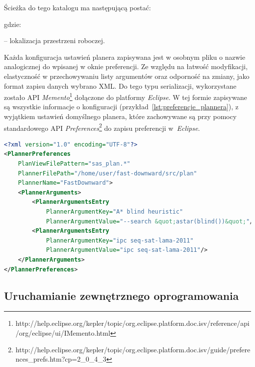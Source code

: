 Ścieżka do tego katalogu ma następującą postać:

\noindent
\centerline{}

\noindent
gdzie:

\noindent
\textbf{} -- lokalizacja przestrzeni roboczej.

Każda konfiguracja ustawień planera zapisywana jest w osobnym pliku o nazwie analogicznej do wpisanej w oknie preferencji. Ze względu na łatwość modyfikacji, elastyczność w przechowywaniu listy argumentów oraz odporność na zmiany, jako format zapisu danych wybrano XML. Do tego typu serializacji, wykorzystane zostało API \emph{Memento}\footnote{http://help.eclipse.org/kepler/topic/org.eclipse.platform.doc.isv/reference/api/org/eclipse/ui/IMemento.html}\cite{eclipseplugins} dołączone do platformy \emph{Eclipse}. W tej formie zapisywane są wszystkie informacje o konfiguracji (przykład~\ref{lst:preferencje_plannera}), z wyjątkiem ustawień domyślnego planera, które zachowywane są przy pomocy standardowego API \emph{Preferences}\footnote{http://help.eclipse.org/kepler/topic/org.eclipse.platform.doc.isv/guide/preferences\_prefs.htm?cp=2\_0\_4\_3}\cite{eclipseplugins} do zapisu preferencji w~\emph{Eclipse}.

\begin{Code}
\begin{lstlisting}[language=XML,frame=single,label={lst:preferencje_plannera},caption={Przykładowa konfiguracja planera FastDownward w postaci XML}]  % Start your code-block
<?xml version="1.0" encoding="UTF-8"?>
<PlannerPreferences 
	PlanViewFilePattern="sas_plan.*" 
	PlannerFilePath="/home/user/fast-downward/src/plan" 
	PlannerName="FastDownward">
	<PlannerArguments>
		<PlannerArgumentsEntry 
			PlannerArgumentKey="A* blind heuristic" 
			PlannerArgumentValue="--search &quot;astar(blind())&quot;"/>
		<PlannerArgumentsEntry 
			PlannerArgumentKey="ipc seq-sat-lama-2011" 
			PlannerArgumentValue="ipc seq-sat-lama-2011"/>
	</PlannerArguments>
</PlannerPreferences>
\end{lstlisting}
\end{Code}

\subsection{Uruchamianie zewnętrznego oprogramowania}
\label{subsec:uruchamianie}


